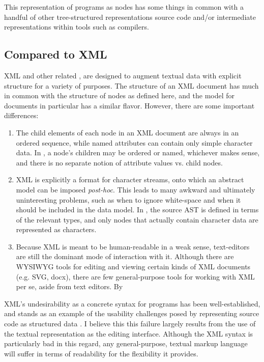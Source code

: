 This representation of programs as nodes has some things in common with a handful of other tree-structured representations source code and/or intermediate representations within tools such as compilers.

\subsection{Compared to XML}
XML and other related , are designed to augment textual data with explicit structure for a variety of purposes. The structure of an XML document has much in common with the structure of nodes as defined here, and the \cite{infoset} model for documents in particular has a similar flavor. However, there are some important differences:
\begin{enumerate}
\item The child elements of each node in an XML document are always in an ordered sequence, while named attributes can contain only simple character data. In \Meta, a node's children may be ordered or named, whichever makes sense, and there is no separate notion of attribute values vs. child nodes.
\item XML is explicitly a format for character streams, onto which an abstract model can be imposed \textit{post-hoc}. This leads to many awkward and ultimately uninteresting problems, such as when to ignore white-space and when it should be included in the data model. In \Meta, the source AST is defined in terms of the relevant types, and only nodes that actually contain character data are represented as characters.
\item Because XML is meant to be human-readable in a weak sense, text-editors are still the dominant mode of interaction with it. Although there are WYSIWYG tools for editing and viewing certain kinds of XML documents (e.g. SVG\cite{svg}, docx\cite{openoffice}), there are few general-purpose tools for working with XML per se, aside from text editors. By 
\end{enumerate}

XML's undesirability as a concrete syntax for programs has been well-established, and stands as an example of the usability challenges posed by representing source code as structured data \cite{holub}\cite{xml-bad-ant}. I believe this this failure largely results from the use of the textual representation as the editing interface. Although the XML syntax is particularly bad in this regard, any general-purpose, textual markup language will suffer in terms of readability for the flexibility it provides.

